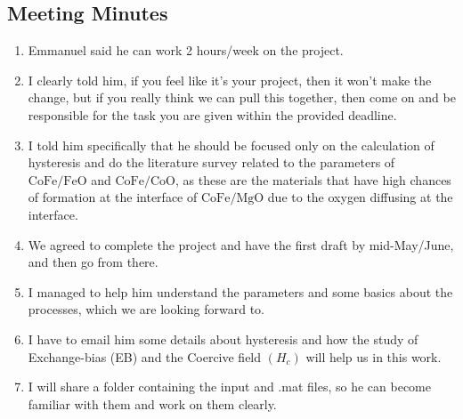 \subsection*{Meeting Minutes}
\begin{enumerate}
    \item Emmanuel said he can work 2 hours/week on the project.
    \item I clearly told him, if you feel like it's your project, then it won't make the change, but if you really think we can pull this together, then come on and be responsible for the task you are given within the provided deadline.
    \item I told him specifically that he should be focused only on the calculation of hysteresis and do the literature survey related to the parameters of $\mathrm{CoFe/FeO}$ and $\mathrm{CoFe/CoO}$, as these are the materials that have high chances of formation at the interface of $\mathrm{CoFe/MgO}$ due to the oxygen diffusing at the interface.
    \item We agreed to complete the project and have the first draft by mid-May/June, and then go from there. 
    \item I managed to help him understand the parameters and some basics about the processes, which we are looking forward to. 
    \item I have to email him some details about hysteresis and how the study of Exchange-bias (EB) and the Coercive field $(H_c)$ will help us in this work. 
    \item I will share a folder containing the input and .mat files, so he can become familiar with them and work on them clearly.
\end{enumerate}
\stardivider